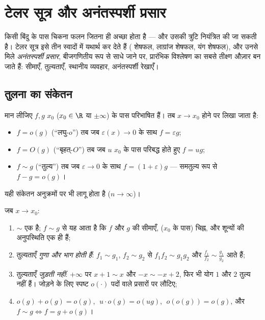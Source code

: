\chapter{टेलर सूत्र और अनंतस्पर्शी प्रसार}\label{ch:b1:taylor}

किसी बिंदु के पास चिकना फलन  जितना ही अच्छा होता है --- और उसकी त्रुटि
नियंत्रित की जा सकती है। टेलर सूत्र इसे तीन स्वादों में यथार्थ कर देते हैं
( शेषफल, लाग्रांज शेषफल, यंग शेषफल), और उनसे मिले \emph{अनंतस्पर्शी
प्रसार}, बीजगणितीय रूप से साधे जाने पर, प्रारंभिक विश्लेषण का सबसे तीक्ष्ण
औज़ार बन जाते हैं: सीमाएँ, तुल्यताएँ, स्थानीय व्यवहार, अनंतस्पर्शी रेखाएँ।

\section{तुलना का संकेतन}

\begin{definition}[लांडाउ संकेतन]\label{def:b1:taylor:landau}
मान लीजिए $f, g$ $x_0$ ($x_0 \in \R$ या $\pm\infty$) के पास परिभाषित हैं। तब
$x \to x_0$ होने पर लिखा जाता है:
\begin{itemize}
  \item $f = o(g)$ (``लघु-$o$'') तब जब $\varepsilon(x) \to 0$ के साथ $f =
  \varepsilon g$;
  \item $f = O(g)$ (``बृहत्-$O$'') तब जब $u$ $x_0$ के पास परिबद्ध होते हुए
  $f = u g$;
  \item $f \sim g$ (``तुल्य'') तब जब $\varepsilon \to 0$ के
  साथ $f = (1 + \varepsilon) g$ --- समतुल्य रूप से $f - g = o(g)$।
\end{itemize}
यही संकेतन अनुक्रमों पर भी लागू होता है ($n \to \infty$)।
\end{definition}

\begin{proposition}[नियम]\label{prop:b1:taylor:landaurules}
जब $x \to x_0$:
\begin{enumerate}
  \item $\sim$ एक  है; $f \sim g$ से यह आता है कि $f$ और $g$ की
  सीमाएँ, ($x_0$ के पास) चिह्न, और शून्यों की अनुपस्थिति एक ही हैं;
  \item तुल्यताएँ \emph{गुणा और भाग होती हैं}: $f_1 \sim g_1$, $f_2 \sim
  g_2$ से $f_1 f_2 \sim g_1 g_2$ और $\frac{f_1}{f_2} \sim \frac{g_1}{g_2}$
  आते हैं;
  \item तुल्यताएँ \emph{जुड़ती नहीं}: $+\infty$ पर $x + 1 \sim x$ और $-x
  \sim -x + 2$, फिर भी योग $1$ और $2$ तुल्य नहीं हैं। जोड़ने के लिए स्पष्ट
  $o(\cdot)$ पदों वाले प्रसारों पर लौटिए;
  \item $o(g) + o(g) = o(g)$, $\;u \cdot o(g) = o(ug)$, $\;o(o(g)) = o(g)$,
  और $f \sim g \iff f = g + o(g)$।
\end{enumerate}
\end{proposition}

